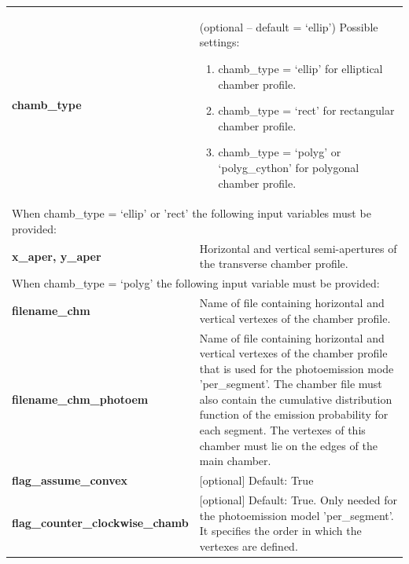 \documentclass[a4paper,12pt]{article}
\begin{document}
\begin{longtable}{p{}p{}}
\hline\endfirsthead\hline\endhead\rowcolor{Gray}
\multicolumn{2}{p{.97\textwidth}}{\textbf{Chamber profile description}}
\\ \hline
\textbf{chamb\_type} & (optional -- default = `ellip') \newline
Possible settings:
\begin{enumerate}
\item chamb\_type = `ellip' for elliptical chamber profile.
\item chamb\_type = `rect' for rectangular chamber profile.
\item chamb\_type = `polyg' or `polyg\_cython' for polygonal chamber profile.
\end{enumerate}
\\ \hline
\multicolumn{2}{p{.97\textwidth}}{When chamb\_type = `ellip' or  'rect' the following input variables must be provided:} \\ \hline
\textbf{x\_aper, y\_aper} & Horizontal and vertical semi-apertures of the transverse chamber profile.  \\ \hline
\multicolumn{2}{p{.97\textwidth}}{When chamb\_type = `polyg' the following input variable must be provided:} \\ \hline
\textbf{filename\_chm} & Name of file containing horizontal and vertical vertexes of the chamber profile. \\\hline
\textbf{filename\_chm\_photoem} & Name of file containing horizontal and vertical vertexes of the chamber profile that is used for the photoemission mode 'per\_segment'.
    The chamber file must also contain the cumulative distribution function of the emission probability for each segment.
    The vertexes of this chamber must lie on the edges of the main chamber.\\ \hline
    \textbf{flag\_assume\_convex} & [optional] Default: True \\\hline
    \textbf{flag\_counter\_clockwise\_chamb} & [optional] Default: True. Only needed for the photoemission model 'per\_segment'. It specifies the order in which the vertexes are defined. \\\hline
\end{longtable}
\end{document}
